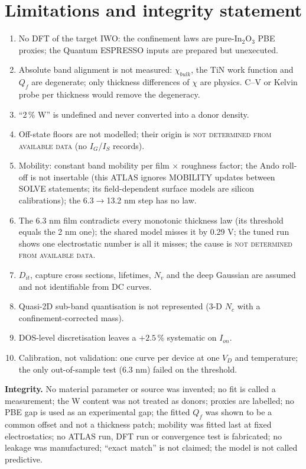\documentclass[11pt,a4paper]{article}
\newcommand{\ND}{\textsc{not determined from available data}}
\begin{document}
\section{Limitations and integrity statement}\label{sec:limits}
\begin{enumerate}[leftmargin=*,itemsep=1pt]
\item No DFT of the target IWO: the confinement laws are pure-In$_2$O$_3$ PBE proxies; the Quantum ESPRESSO inputs are prepared but unexecuted.
\item Absolute band alignment is not measured: $\chi_{bulk}$, the TiN work function and $Q_f$ are degenerate; only thickness differences of $\chi$ are physics. C--V or Kelvin probe per thickness would remove the degeneracy.
\item ``2\,\% W'' is undefined and never converted into a donor density.
\item Off-state floors are not modelled; their origin is \ND{} (no $I_G$/$I_S$ records).
\item Mobility: constant band mobility per film $\times$ roughness factor; the Ando roll-off is not insertable (this ATLAS ignores MOBILITY updates between SOLVE statements; its field-dependent surface models are silicon calibrations); the 6.3$\to$13.2 nm step has no law.
\item The 6.3 nm film contradicts every monotonic thickness law (its threshold equals the 2 nm one); the shared model misses it by 0.29 V; the tuned run shows one electrostatic number is all it misses; the cause is \ND.
\item $D_{it}$, capture cross sections, lifetimes, $N_v$ and the deep Gaussian are assumed and not identifiable from DC curves.
\item Quasi-2D sub-band quantisation is not represented (3-D $N_c$ with a confinement-corrected mass).
\item DOS-level discretisation leaves a $+2.5$\,\% systematic on $I_{on}$.
\item Calibration, not validation: one curve per device at one $V_D$ and temperature; the only out-of-sample test (6.3 nm) failed on the threshold.
\end{enumerate}
\textbf{Integrity.} No material parameter or source was invented; no fit is called a measurement; the W content was not treated as donors; proxies are labelled; no PBE gap is used as an experimental gap; the fitted $Q_f$ was shown to be a common offset and not a thickness patch; mobility was fitted last at fixed electrostatics; no ATLAS run, DFT run or convergence test is fabricated; no leakage was manufactured; ``exact match'' is not claimed; the model is not called predictive.
\end{document}
